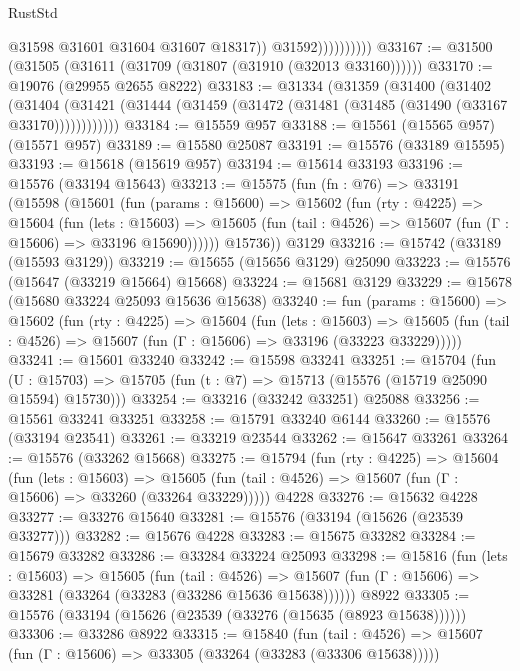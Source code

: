 \begin{lexlean}{RustStd}
\begin{coremodule}
                            @31598
                            @31601
                            @31604
                            @31607
                            @18317))
                        @31592))))))))))
@33167 := @31500 (@31505 (@31611 (@31709 (@31807 (@31910 (@32013 @33160))))))
@33170 := @19076 (@29955 @2655 @8222)
@33183 := @31334
    (@31359
      (@31400
        (@31402
          (@31404 (@31421 (@31444 (@31459 (@31472 (@31481 (@31485 (@31490 (@33167 @33170))))))))))))
@33184 := @15559 @957
@33188 := @15561 (@15565 @957) (@15571 @957)
@33189 := @15580 @25087
@33191 := @15576 (@33189 @15595)
@33193 := @15618 (@15619 @957)
@33194 := @15614 @33193
@33196 := @15576 (@33194 @15643)
@33213 := @15575
    (fun (fn : @76) =>
    @33191
      (@15598
        (@15601
          (fun (params : @15600) =>
          @15602
            (fun (rty : @4225) =>
            @15604
              (fun (lets : @15603) =>
              @15605 (fun (tail : @4526) => @15607 (fun (Γ : @15606) => @33196 @15690))))))
        @15736))
    @3129
@33216 := @15742 (@33189 (@15593 @3129))
@33219 := @15655 (@15656 @3129) @25090
@33223 := @15576 (@15647 (@33219 @15664) @15668)
@33224 := @15681 @3129
@33229 := @15678 (@15680 @33224 @25093 @15636 @15638)
@33240 := fun (params : @15600) =>
  @15602
    (fun (rty : @4225) =>
    @15604
      (fun (lets : @15603) =>
      @15605 (fun (tail : @4526) => @15607 (fun (Γ : @15606) => @33196 (@33223 @33229)))))
@33241 := @15601 @33240
@33242 := @15598 @33241
@33251 := @15704
    (fun (U : @15703) => @15705 (fun (t : @7) => @15713 (@15576 (@15719 @25090 @15594) @15730)))
@33254 := @33216 (@33242 @33251) @25088
@33256 := @15561 @33241 @33251
@33258 := @15791 @33240 @6144
@33260 := @15576 (@33194 @23541)
@33261 := @33219 @23544
@33262 := @15647 @33261
@33264 := @15576 (@33262 @15668)
@33275 := @15794
    (fun (rty : @4225) =>
    @15604
      (fun (lets : @15603) =>
      @15605 (fun (tail : @4526) => @15607 (fun (Γ : @15606) => @33260 (@33264 @33229)))))
    @4228
@33276 := @15632 @4228
@33277 := @33276 @15640
@33281 := @15576 (@33194 (@15626 (@23539 @33277)))
@33282 := @15676 @4228
@33283 := @15675 @33282
@33284 := @15679 @33282
@33286 := @33284 @33224 @25093
@33298 := @15816
    (fun (lets : @15603) =>
    @15605
      (fun (tail : @4526) =>
      @15607 (fun (Γ : @15606) => @33281 (@33264 (@33283 (@33286 @15636 @15638))))))
    @8922
@33305 := @15576 (@33194 (@15626 (@23539 (@33276 (@15635 (@8923 @15638))))))
@33306 := @33286 @8922
@33315 := @15840
    (fun (tail : @4526) => @15607 (fun (Γ : @15606) => @33305 (@33264 (@33283 (@33306 @15638)))))

\end{coremodule}
\end{lexlean}
